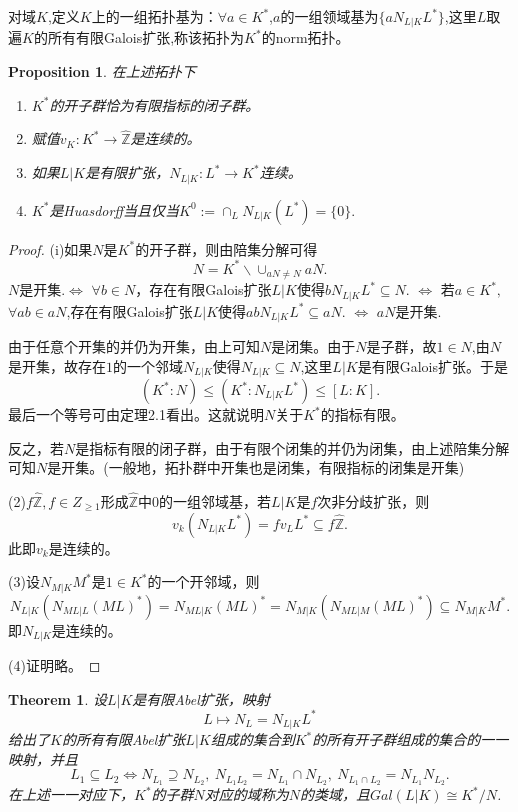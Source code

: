 \documentclass[UTF8]{article}
\newtheorem{thm}{Theorem}[section]
\newtheorem{prop}{Proposition}[section]
\begin{document}
对域$K$,定义$K$上的一组拓扑基为：$\forall a\in K^{*}$,$a$的一组领域基为$\{aN_{L|K}L^{*}\}$,这里$L$取遍$K$的所有有限Galois扩张,称该拓扑为$K^{*}$的norm拓扑。\\
\begin{prop}在上述拓扑下
	\begin{enumerate}
		\item $K^{*}$的开子群恰为有限指标的闭子群。
		\item 赋值$v_{K}:K^{*}\rightarrow \widehat{\mathbb{Z}}$是连续的。
       \item 如果$L|K$是有限扩张，$N_{L|K}:L^{*}\rightarrow K^{*}$连续。
       \item $K^{*}$是Huasdorff当且仅当$K^{0}:=\cap_{L}N_{L|K}(L^{*})=\{0\}.$
	\end{enumerate}
\end{prop}
\begin{proof}
	(i)如果$N$是$K^{*}$的开子群，则由陪集分解可得
	$$
	N=K^{*}\backslash \cup_{aN\neq N}aN.
	$$
$N$是开集.$\Leftrightarrow$ $\forall b\in N$，存在有限Galois扩张$L|K$使得$bN_{L|K}L^{*}\subseteq N$. $\Leftrightarrow$ 若$a\in K^{*} ,$ $ \forall ab\in aN$,存在有限Galois扩张$L|K$使得$abN_{L|K}L^{*}\subseteq aN$. $\Leftrightarrow$ $aN$是开集.

由于任意个开集的并仍为开集，由上可知$N$是闭集。由于$N$是子群，故$1\in N$,由$N$是开集，故存在$1$的一个邻域$N_{L|K}$使得$N_{L|K}\subseteq N$,这里$L|K$是有限Galois扩张。于是
$$
(K^{*}:N)\leq (K^{*}:N_{L|K}L^{*})\leq [L:K] .
$$
最后一个等号可由定理2.1看出。这就说明$N$关于$K^{*}$的指标有限。

反之，若$N$是指标有限的闭子群，由于有限个闭集的并仍为闭集，由上述陪集分解可知$N$是开集。(一般地，拓扑群中开集也是闭集，有限指标的闭集是开集)

(2)$f\widehat{\mathbb{Z}},f\in Z_{\geq 1}$形成$\widehat{\mathbb{Z}}$中$0$的一组邻域基，若$L|K$是$f$次非分歧扩张，则
$$
v_{k}(N_{L|K}L^{*})=fv_{L}L^{*}\subseteq f\widehat{\mathbb{Z}}.
$$
此即$v_{k}$是连续的。

(3)设$N_{M|K}M^{*}$是$1\in K^{*}$的一个开邻域，则$$
N_{L|K}(N_{ML|L}(ML)^{*})=N_{ML|K}(ML)^{*}=N_{M|K}(N_{ML|M}(ML)^{*})\subseteq N_{M|K}M^{*}.
$$
即$N_{L|K}$是连续的。

(4)证明略。
\end{proof}
\begin{thm}
	设$L|K$是有限Abel扩张，映射$$
	L\mapsto N_{L}=N_{L|K}L^{*}
	$$
	给出了$K$的所有有限Abel扩张$L|K$组成的集合到$K^{*}$的所有开子群组成的集合的一一映射，并且
	$$
	L_{1}\subseteq L_{2}\Longleftrightarrow N_{L_{1}}\supseteq N_{L_{2}},\ 
	N_{L_{1}L_{2}}=N_{L_{1}}\cap N_{L_{2}},\  N_{L_{1}\cap L_{2}}=N_{L_{1}}N_{L_{2}}.
	$$
	在上述一一对应下，$K^{*}$的子群$N$对应的域称为$N$的类域，且$Gal(L|K)\cong K^{*}/N$.
\end{thm}
\end{document}
